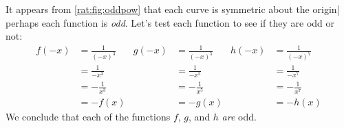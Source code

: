 \begin{pccexample}
\begin{pccsolution}
		It appears from \cref{rat:fig:oddpow} that each curve is symmetric
		about the origin| perhaps each function is \emph{odd}. 
		Let's test each function to see if they are odd or not:
		\begin{align*}
			f(-x) & =\frac{1}{(-x)^3} & g(-x) & =\frac{1}{(-x)^5} & h(-x) & =\frac{1}{(-x)^7} \\ 
			      & =\frac{1}{-x^3}   &       & =\frac{1}{-x^5}   &       & =\frac{1}{-x^7}   \\   
			      & =-\frac{1}{x^3}   &       & =-\frac{1}{x^5}   &       & =-\frac{1}{x^7}   \\   
			      & =-f(x)            &       & =-g(x)            &       & =-h(x)            
		\end{align*}
		We conclude that each of the functions $f$, $g$, and $h$ \emph{are} odd.
	\end{pccsolution}
\end{pccexample}

